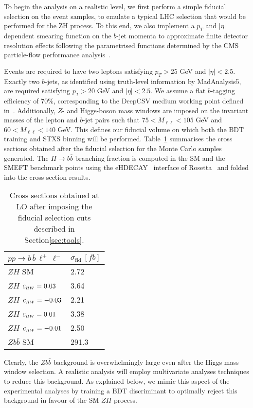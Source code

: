 To begin the analysis on a realistic level, we first perform a simple fiducial selection on the event samples, to emulate a typical LHC selection that would be performed for the ZH process. To this end, we also implement a $p_T$ and $|\eta|$ dependent smearing function on the $b$-jet momenta to approximate finite detector resolution effects following the parametrised functions determined by the CMS particle-flow performance analysis~\cite{Sirunyan:2017ulk}.

Events are required to have two leptons satisfying $p_T > 25$ GeV and $|\eta|< 2.5$. Exactly two $b$-jets, as identified using truth-level information by {\sc MadAnalysis5}, are required satisfying $p_T > 20$ GeV and $|\eta|< 2.5$. We assume a flat $b$-tagging efficiency of $70\%$, corresponding to the DeepCSV medium working point defined in~\cite{Sirunyan:2017ezt}. Additionally, $Z$- and Higgs-boson mass windows are imposed on the invariant masses of the lepton and $b$-jet pairs such that $75 < M_{\ell\ell} < 105$ GeV and  $60 < M_{\ell\ell} < 140$ GeV. This defines our fiducial volume on which both the BDT training and STXS binning will be performed. Table~\ref{tab:FiducialXS} summarises the cross sections obtained after the fiducial selection for the Monte Carlo samples generated. The $H\to b\bar{b}$ branching fraction is computed in the SM and the SMEFT benchmark points using the e{\sc HDECAY}~\cite{Contino:2014aaa} interface of {\sc Rosetta}~\cite{Falkowski:2015wza} and folded into the cross section results.
\begin{table}
    \centering
    \begin{tabular}{|l|l|}
        \hline
        $pp\to b\,\bar{b}\,\ell^+\,\ell^-$& $\sigma_{\text{fid.}} [fb]$\tabularnewline
        \hline
        $ZH$ SM&2.72\tabularnewline
        $ZH$ $c_{\scriptscriptstyle HW} = 0.03$&3.64\tabularnewline
        $ZH$ $c_{\scriptscriptstyle HW} = -0.03$&2.21\tabularnewline
        $ZH$ $c_{\scriptscriptstyle HW} = 0.01$&3.38\tabularnewline
        $ZH$ $c_{\scriptscriptstyle HW} = -0.01$&2.50\tabularnewline
        $Z b\bar{b}$ SM&291.3\tabularnewline
        \hline
    \end{tabular}
    \caption{\label{tab:FiducialXS} Cross sections obtained at LO after imposing the fiducial selection cuts described in Section\ref{sec:tools}.}
\end{table}
Clearly, the $Z b\bar{b}$ background is overwhelmingly large even after the Higgs mass
window selection. A realistic analysis will employ multivariate analyses techniques to
reduce this background. As explained below, we mimic this aspect of the
experimental analyses by training a BDT discriminant to optimally reject this background
in favour of the SM $ZH$ process.

